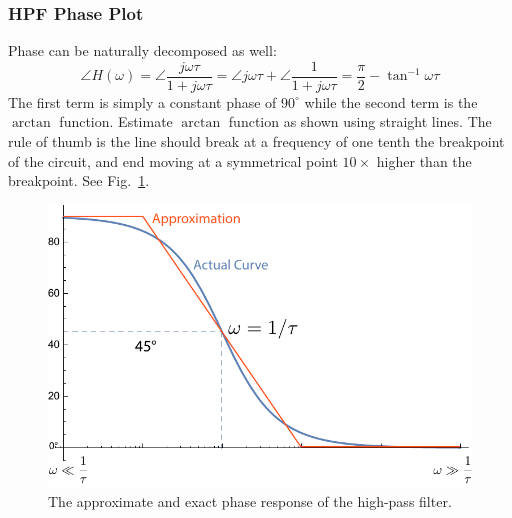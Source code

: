 \subsubsection{HPF Phase Plot}
Phase can be naturally decomposed as well:
    \begin{equation}
        \angle H(\omega ) = \angle \frac{{j\omega \tau }}{{1 + j\omega \tau }} = \angle j\omega \tau + \angle \frac{1}{{1 + j\omega \tau }} = \frac{\pi }{2} - {\tan ^{ - 1}}\omega \tau
    \end{equation}
The first term is simply a constant phase of $90^\circ$ while the second term is the $\arctan$ function.  Estimate $\arctan$ function as shown using straight lines.  The rule of thumb is the line should break at a frequency of one tenth the breakpoint of the circuit, and end moving at a symmetrical point $10\times$ higher than the breakpoint.  See Fig.~\ref{fig:bode_phase}.
\begin{figure}[tb]
\centering
\includegraphics[width=.55\columnwidth]{mod1_3_12_bode4}
\caption{The approximate and exact phase response of the high-pass filter.}
\label{fig:bode_phase}
\end{figure}
